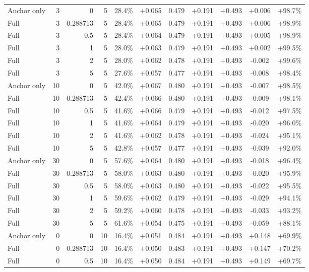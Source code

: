 \begin{table}[htbp]
\begin{tabular}{lrrrccccccc}
Anchor only & 3 & 0 & 5 & 28.4\% & +0.065 & 0.479 & +0.191 & +0.493 & +0.006 & +98.7\% \\
Full & 3 & 0.288713 & 5 & 28.4\% & +0.065 & 0.479 & +0.191 & +0.493 & +0.006 & +98.9\% \\
Full & 3 & 0.5 & 5 & 28.4\% & +0.064 & 0.479 & +0.191 & +0.493 & +0.005 & +98.9\% \\
Full & 3 & 1 & 5 & 28.0\% & +0.063 & 0.479 & +0.191 & +0.493 & +0.002 & +99.5\% \\
Full & 3 & 2 & 5 & 28.0\% & +0.062 & 0.478 & +0.191 & +0.493 & -0.002 & +99.6\% \\
Full & 3 & 5 & 5 & 27.6\% & +0.057 & 0.477 & +0.191 & +0.493 & -0.008 & +98.4\% \\
Anchor only & 10 & 0 & 5 & 42.0\% & +0.067 & 0.480 & +0.191 & +0.493 & -0.007 & +98.5\% \\
Full & 10 & 0.288713 & 5 & 42.4\% & +0.066 & 0.480 & +0.191 & +0.493 & -0.009 & +98.1\% \\
Full & 10 & 0.5 & 5 & 41.6\% & +0.066 & 0.479 & +0.191 & +0.493 & -0.012 & +97.5\% \\
Full & 10 & 1 & 5 & 41.6\% & +0.064 & 0.479 & +0.191 & +0.493 & -0.020 & +96.0\% \\
Full & 10 & 2 & 5 & 41.6\% & +0.062 & 0.478 & +0.191 & +0.493 & -0.024 & +95.1\% \\
Full & 10 & 5 & 5 & 42.8\% & +0.057 & 0.477 & +0.191 & +0.493 & -0.039 & +92.0\% \\
Anchor only & 30 & 0 & 5 & 57.6\% & +0.064 & 0.480 & +0.191 & +0.493 & -0.018 & +96.4\% \\
Full & 30 & 0.288713 & 5 & 58.0\% & +0.063 & 0.480 & +0.191 & +0.493 & -0.020 & +95.9\% \\
Full & 30 & 0.5 & 5 & 58.0\% & +0.063 & 0.480 & +0.191 & +0.493 & -0.022 & +95.5\% \\
Full & 30 & 1 & 5 & 59.6\% & +0.062 & 0.479 & +0.191 & +0.493 & -0.029 & +94.1\% \\
Full & 30 & 2 & 5 & 59.2\% & +0.060 & 0.478 & +0.191 & +0.493 & -0.033 & +93.2\% \\
Full & 30 & 5 & 5 & 61.6\% & +0.054 & 0.475 & +0.191 & +0.493 & -0.059 & +88.1\% \\
Anchor only & 0 & 0 & 10 & 16.4\% & +0.051 & 0.484 & +0.191 & +0.493 & +0.148 & +69.9\% \\
Full & 0 & 0.288713 & 10 & 16.4\% & +0.050 & 0.483 & +0.191 & +0.493 & +0.147 & +70.2\% \\
Full & 0 & 0.5 & 10 & 16.4\% & +0.050 & 0.484 & +0.191 & +0.493 & +0.149 & +69.7\% \\

\end{tabular}
\end{table}
